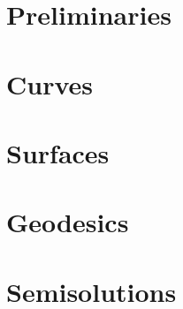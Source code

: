 \documentclass[twoside]{book}
\begin{document}


\part{Preliminaries}


\part{Curves}






\part{Surfaces}


   

%
%

\part{Geodesics}


%

%





\part{Semisolutions}




\sloppy
\printbibliography[heading=bibintoc]
\fussy
\end{document}
